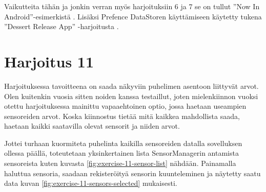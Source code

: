 Vaikutteita tähän ja jonkin verran myös harjoituksiin 6 ja 7 se on tullut
''Now In Android''-esimerkistä \parencite{GithubAndroidNowInAndroid}. Lisäksi
Prefence DataStoren käyttämiseen käytetty tukena ''Dessert Release App''
-harjoitusta \parencite{GithubGoogleDevTrainingDessertRelease}.

\section{Harjoitus 11}

Harjoituksessa tavoitteena on saada näkyviin puhelimen asentoon liittyvät
arvot. Olen kuitenkin vuosia sitten noiden kanssa testaillut, joten
mielenkiinnon vuoksi otettu harjoituksessa mainittu vapaaehtoinen optio, jossa
haetaan useampien sensoreiden arvot. Koska kiinnostus tietää mitä kaikkea
mahdollista saada, haetaan kaikki saatavilla olevat sensorit ja niiden arvot.

Jottei turhaan kuormiteta puhelinta kaikilla sensoreiden datalla sovelluksen
ollessa päällä, toteutetaan yksinkertainen lista SensorManagerin antamista
sensoreista kuten kuvasta \ref{fig:exercise-11-sensor-list} nähdään. Painamalla
haluttua sensoria, saadaan rekisteröityä sensorin kuunteleminen ja näytetty
saatu data kuvan \ref{fig:exercise-11-sensors-selected} mukaisesti.


